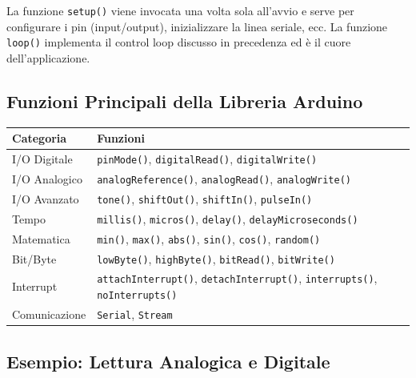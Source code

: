 \documentclass[
  italian,
  openany]{book}
\newcounter{none} %
\begin{document}
La funzione \texttt{setup()} viene invocata una volta sola all'avvio e
serve per configurare i pin (input/output), inizializzare la linea
seriale, ecc. La funzione \texttt{loop()} implementa il control loop
discusso in precedenza ed è il cuore dell'applicazione.

\subsection{Funzioni Principali della Libreria
Arduino}\label{funzioni-principali-della-libreria-arduino}

{\def\LTcaptype{none} %
\begin{longtable}[]{@{}
  >{\raggedright\arraybackslash}p{}
  >{\raggedright\arraybackslash}p{}@{}}
\toprule\noalign{}
\begin{minipage}[b]{\linewidth}\raggedright
Categoria
\end{minipage} & \begin{minipage}[b]{\linewidth}\raggedright
Funzioni
\end{minipage} \\
\midrule\noalign{}
\endhead
\bottomrule\noalign{}
\endlastfoot
I/O Digitale & \texttt{pinMode()}, \texttt{digitalRead()},
\texttt{digitalWrite()} \\
I/O Analogico & \texttt{analogReference()}, \texttt{analogRead()},
\texttt{analogWrite()} \\
I/O Avanzato & \texttt{tone()}, \texttt{shiftOut()}, \texttt{shiftIn()},
\texttt{pulseIn()} \\
Tempo & \texttt{millis()}, \texttt{micros()}, \texttt{delay()},
\texttt{delayMicroseconds()} \\
Matematica & \texttt{min()}, \texttt{max()}, \texttt{abs()},
\texttt{sin()}, \texttt{cos()}, \texttt{random()} \\
Bit/Byte & \texttt{lowByte()}, \texttt{highByte()}, \texttt{bitRead()},
\texttt{bitWrite()} \\
Interrupt & \texttt{attachInterrupt()}, \texttt{detachInterrupt()},
\texttt{interrupts()}, \texttt{noInterrupts()} \\
Comunicazione & \texttt{Serial}, \texttt{Stream} \\
\end{longtable}
}

\subsection{Esempio: Lettura Analogica e
Digitale}\label{esempio-lettura-analogica-e-digitale}
\end{document}

